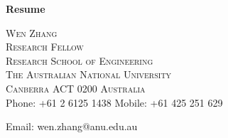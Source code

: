 \documentclass[11pt]{article}
\begin{document}
\thispagestyle{plain}
\begin{center}
\begin{huge}
\textbf{Resume}\\
\end{huge}
\end{center}

\begin{center}
\begin{large}
\textsc{Wen Zhang\\
Research Fellow\\
Research School of Engineering\\
The Australian National University \\
Canberra ACT 0200 Australia\\
}
Phone: +61 2 6125 1438\hspace{10pt} Mobile: +61 425 251 629

Email: wen.zhang@anu.edu.au
\end{large}
\end{center}
\hspace{0.5cm}


\end{document}
